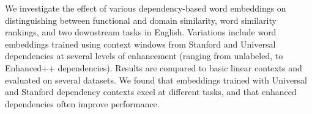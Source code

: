 We investigate the effect of various dependency-based word embeddings on distinguishing between functional and domain similarity, word similarity rankings, and two downstream tasks in English. Variations include word embeddings trained using context windows from Stanford and Universal dependencies at several levels of enhancement (ranging from unlabeled, to Enhanced++ dependencies). Results are compared to basic linear contexts and evaluated on several datasets. We found that embeddings trained with Universal and Stanford dependency contexts excel at different tasks, and that enhanced dependencies often improve performance.
